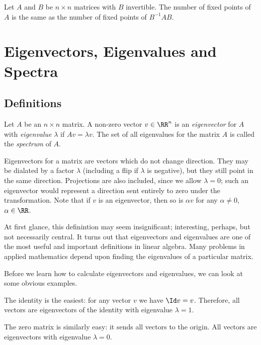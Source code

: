 \documentclass[fleqn]{report}
\begin{document}
\begin{prop}
Let $A$ and $B$ be $n \times n$ matrices with $B$ invertible.
The number of fixed points of $A$ is the same as the number of
fixed points of $B^{-1}AB$. 
\end{prop}

\section{Eigenvectors, Eigenvalues and Spectra}
\label{eigenvectors}

\subsection{Definitions}
\label{eigenvectors-definitions}

\begin{defn}
Let $A$ be an $n \times n$ matrix. A non-zero vector $v \in
\RR^n$ is an \emph{eigenvector} for $A$ with \emph{eigenvalue}
$\lambda$ if $Av = \lambda v$. The set of all eigenvalues for
the matrix $A$ is called the \emph{spectrum} of $A$.
\end{defn}

Eigenvectors for a matrix are vectors which do not change
direction. They may be dialated by a factor $\lambda$
(including a flip if $\lambda$ is negative), but they still
point in the same direction. Projections are also included,
since we allow $\lambda = 0$; such an eigenvector would
represent a direction sent entirely to zero under the
transformation. Note that if $v$ is an eigenvector, then so
is $\alpha v$ for any $\alpha \neq 0$, $\alpha \in \RR$. 

At first glance, this definintion may seem insignificant;
interesting, perhaps, but not necessarily central. It turns
out that eigenvectors and eigenvalues are one of the most
useful and important definitions in linear algebra. Many
problems in applied mathematics depend upon finding the
eigenvalues of a particular matrix.

Before we learn how to calculate eigenvectors
and eigenvalues, we can look at some obvious examples. 

\begin{example}
The identity is the easiest: for any vector $v$ we have $\Id v =
v$. Therefore, all vectors are eigenvectors of the identity
with eigenvalue $\lambda = 1$. 
\end{example}

\begin{example}
The zero matrix is similarly easy: it sends all vectors to the
origin. All vectors are eigenvectors with eigenvalue $\lambda = 0$.
\end{example}
\end{document}
